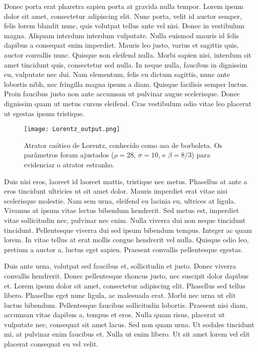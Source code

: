 Donec porta erat pharetra sapien porta at gravida nulla tempor. Lorem
ipsum dolor sit amet, consectetur adipiscing elit. Nunc porta, velit
id auctor semper, felis lorem blandit nunc, quis volutpat tellus ante
vel nisi. Donec in vestibulum magna. Aliquam interdum interdum
vulputate. Nulla euismod mauris id felis dapibus a consequat enim
imperdiet. Mauris leo justo, varius et sagittis quis, auctor convallis
nunc. Quisque non eleifend nulla. Morbi sapien nisi, interdum sit amet
tincidunt quis, consectetur sed nulla. In neque nulla, faucibus in
dignissim eu, vulputate nec dui. Nam elementum, felis eu dictum
sagittis, nunc ante lobortis nibh, nec fringilla magna ipsum a
diam. Quisque facilisis semper luctus. Proin faucibus justo non ante
accumsan ut pulvinar augue scelerisque. Donec dignissim quam ut metus
cursus eleifend. Cras vestibulum odio vitae leo placerat ut egestas
ipsum tristique.

\begin{figure}
  \texttt{[image: Lorentz\_output.png]}
  \caption{Atrator ca\'otico de Lorentz, conhecido como asa de
    borboleta. Os par\^ametros foram ajustados ($\rho = 28$, $\sigma =
    10$, e $\beta = 8/3$) para evidenciar o atrator estranho.}
  \fonte{} %
\end{figure}

Duis nisi eros, laoreet id laoreet mattis, tristique nec
metus. Phasellus at ante a eros tincidunt ultricies ut sit amet
dolor. Mauris imperdiet erat vitae nisi scelerisque molestie. Nam sem
urna, eleifend eu lacinia eu, ultrices at ligula. Vivamus at ipsum
vitae lectus bibendum hendrerit. Sed metus est, imperdiet vitae
sollicitudin nec, pulvinar nec enim. Nulla viverra dui non neque
tincidunt tincidunt. Pellentesque viverra dui sed ipsum bibendum
tempus. Integer ac quam lorem. In vitae tellus at erat mollis congue
hendrerit vel nulla. Quisque odio leo, pretium a auctor a, luctus eget
sapien. Praesent convallis pellentesque egestas.

Duis ante urna, volutpat sed faucibus et, sollicitudin et justo. Donec
viverra convallis hendrerit. Donec pellentesque rhoncus justo, nec
suscipit dolor dapibus et. Lorem ipsum dolor sit amet, consectetur
adipiscing elit. Phasellus sed tellus libero. Phasellus eget nunc
ligula, ac malesuada erat. Morbi nec urna ut elit luctus
bibendum. Pellentesque faucibus sollicitudin lobortis. Praesent nisi
diam, accumsan vitae dapibus a, tempus et eros. Nulla quam risus,
placerat ut vulputate nec, consequat sit amet lacus. Sed non quam
urna. Ut sodales tincidunt mi, at pulvinar enim faucibus et. Nulla ut
enim libero. Ut sit amet lorem vel elit placerat consequat eu vel
velit.

